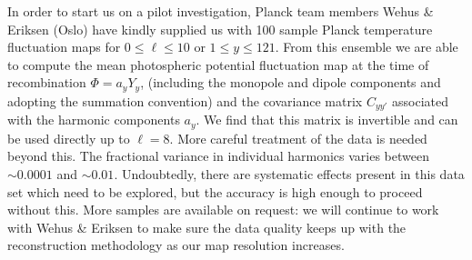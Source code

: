 \documentclass[psfig,12pt]{article}
\begin{document}
In order to start us on a pilot investigation, Planck team members Wehus \&
Eriksen  (Oslo) have kindly supplied us with 100 sample Planck temperature
fluctuation maps for $0\le\ell\le10$ or $1\le y\le121$. From this
ensemble we are able to compute the mean photospheric potential
fluctuation map at the time of recombination $\Phi=a_yY_y$, (including
the monopole and dipole components and adopting the summation
convention) and the covariance matrix $C_{yy'}$ associated with the
harmonic components $a_y$. We find that this matrix is invertible and
can be used directly up to $\ell=8$. More careful treatment of the data
is needed beyond this. The fractional variance in individual harmonics
varies between $\sim0.0001$ and $\sim0.01$. Undoubtedly, there are
systematic effects present in this data set which need to be explored,
but the accuracy is high enough to proceed without this.
More samples are available on request: we will continue to work with
Wehus \& Eriksen to make sure the data quality keeps up with the
reconstruction methodology as our map resolution increases.
\end{document}
